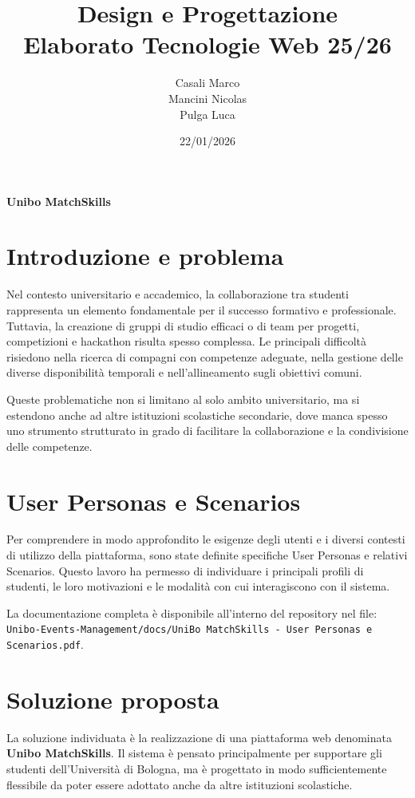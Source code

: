 \documentclass[a4paper,12pt]{article}
\title{\textbf{Design e Progettazione}\\
Elaborato Tecnologie Web 25/26}
\author{Casali Marco \\ Mancini Nicolas \\ Pulga Luca}
\date{22/01/2026}
\begin{document}
\maketitle

\begin{center}
\textbf{Unibo MatchSkills}
\end{center}

\newpage
\tableofcontents
\newpage


\section{Introduzione e problema}

Nel contesto universitario e accademico, la collaborazione tra studenti rappresenta un elemento fondamentale per il successo formativo e professionale. Tuttavia, la creazione di gruppi di studio efficaci o di team per progetti, competizioni e hackathon risulta spesso complessa. Le principali difficoltà risiedono nella ricerca di compagni con competenze adeguate, nella gestione delle diverse disponibilità temporali e nell’allineamento sugli obiettivi comuni.

Queste problematiche non si limitano al solo ambito universitario, ma si estendono anche ad altre istituzioni scolastiche secondarie, dove manca spesso uno strumento strutturato in grado di facilitare la collaborazione e la condivisione delle competenze.

\section{User Personas e Scenarios}

Per comprendere in modo approfondito le esigenze degli utenti e i diversi contesti di utilizzo della piattaforma, sono state definite specifiche User Personas e relativi Scenarios. Questo lavoro ha permesso di individuare i principali profili di studenti, le loro motivazioni e le modalità con cui interagiscono con il sistema.

La documentazione completa è disponibile all’interno del repository nel file:\\
\texttt{Unibo-Events-Management/docs/UniBo MatchSkills - User Personas e Scenarios.pdf}.

\section{Soluzione proposta}

La soluzione individuata è la realizzazione di una piattaforma web denominata \textbf{Unibo MatchSkills}. Il sistema è pensato principalmente per supportare gli studenti dell’Università di Bologna, ma è progettato in modo sufficientemente flessibile da poter essere adottato anche da altre istituzioni scolastiche.
\end{document}
